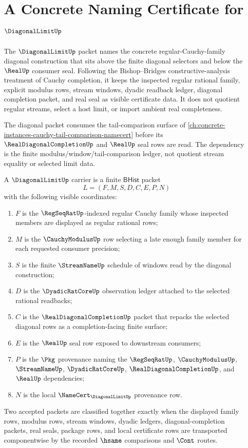 \chapter{A Concrete Naming Certificate for $\DiagonalLimitUp$}
\label{ch:concrete-instances-diagonallimit-namecert}

The $\DiagonalLimitUp$ packet names the concrete regular-Cauchy-family diagonal construction that sits above the finite diagonal selectors and below the $\RealUp$ consumer seal. Following the Bishop--Bridges constructive-analysis treatment of Cauchy completion, it keeps the inspected regular rational family, explicit modulus rows, stream windows, dyadic readback ledger, diagonal completion packet, and real seal as visible certificate data. It does not quotient regular streams, select a host limit, or import ambient real completeness.

The diagonal packet consumes the tail-comparison surface of \autoref{ch:concrete-instances-cauchy-tail-comparison-namecert} before its $\RealDiagonalCompletionUp$ and $\RealUp$ seal rows are read. The dependency is the finite modulus/window/tail-comparison ledger, not quotient stream equality or selected limit data.

\begin{definition}
\label{def:diagonallimit-regular-cauchy-family-carrier}
A $\DiagonalLimitUp$ carrier is a finite $\mathsf{BHist}$ packet
$$
L=(F,M,S,D,C,E,P,N)
$$
with the following visible coordinates:
\begin{enumerate}
\item $F$ is the $\RegSeqRatUp$-indexed regular Cauchy family whose inspected members are displayed as regular rational rows;
\item $M$ is the $\CauchyModulusUp$ row selecting a late enough family member for each requested consumer precision;
\item $S$ is the finite $\StreamNameUp$ schedule of windows read by the diagonal construction;
\item $D$ is the $\DyadicRatCoreUp$ observation ledger attached to the selected rational readbacks;
\item $C$ is the $\RealDiagonalCompletionUp$ packet that repacks the selected diagonal rows as a completion-facing finite surface;
\item $E$ is the $\RealUp$ seal row exposed to downstream consumers;
\item $P$ is the $\Pkg$ provenance naming the $\RegSeqRatUp$, $\CauchyModulusUp$, $\StreamNameUp$, $\DyadicRatCoreUp$, $\RealDiagonalCompletionUp$, and $\RealUp$ dependencies;
\item $N$ is the local $\NameCert_{\DiagonalLimitUp}$ provenance row.
\end{enumerate}
Two accepted packets are classified together exactly when the displayed family rows, modulus rows, stream windows, dyadic ledgers, diagonal-completion packets, real seals, package rows, and local certificate rows are transported componentwise by the recorded $\hsame$ comparisons and $\Cont$ routes.
\end{definition}

